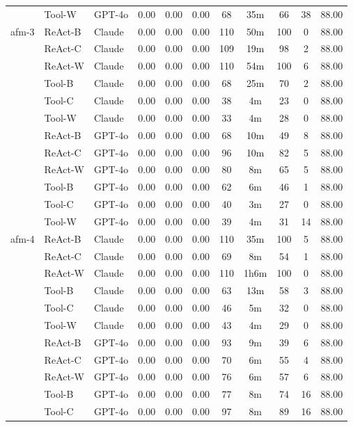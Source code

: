 \begin{longtable}{lllcccccccc}
 & Tool-W & GPT-4o & 0.00 & 0.00 & 0.00 & 68 & 35m & 66 & 38 & 88.00 \\
afm-3 & ReAct-B & Claude & 0.00 & 0.00 & 0.00 & 110 & 50m & 100 & 0 & 88.00 \\
 & ReAct-C & Claude & 0.00 & 0.00 & 0.00 & 109 & 19m & 98 & 2 & 88.00 \\
 & ReAct-W & Claude & 0.00 & 0.00 & 0.00 & 110 & 54m & 100 & 6 & 88.00 \\
 & Tool-B & Claude & 0.00 & 0.00 & 0.00 & 68 & 25m & 70 & 2 & 88.00 \\
 & Tool-C & Claude & 0.00 & 0.00 & 0.00 & 38 & 4m & 23 & 0 & 88.00 \\
 & Tool-W & Claude & 0.00 & 0.00 & 0.00 & 33 & 4m & 28 & 0 & 88.00 \\
 & ReAct-B & GPT-4o & 0.00 & 0.00 & 0.00 & 68 & 10m & 49 & 8 & 88.00 \\
 & ReAct-C & GPT-4o & 0.00 & 0.00 & 0.00 & 96 & 10m & 82 & 5 & 88.00 \\
 & ReAct-W & GPT-4o & 0.00 & 0.00 & 0.00 & 80 & 8m & 65 & 5 & 88.00 \\
 & Tool-B & GPT-4o & 0.00 & 0.00 & 0.00 & 62 & 6m & 46 & 1 & 88.00 \\
 & Tool-C & GPT-4o & 0.00 & 0.00 & 0.00 & 40 & 3m & 27 & 0 & 88.00 \\
 & Tool-W & GPT-4o & 0.00 & 0.00 & 0.00 & 39 & 4m & 31 & 14 & 88.00 \\
afm-4 & ReAct-B & Claude & 0.00 & 0.00 & 0.00 & 110 & 35m & 100 & 5 & 88.00 \\
 & ReAct-C & Claude & 0.00 & 0.00 & 0.00 & 69 & 8m & 54 & 1 & 88.00 \\
 & ReAct-W & Claude & 0.00 & 0.00 & 0.00 & 110 & 1h6m & 100 & 0 & 88.00 \\
 & Tool-B & Claude & 0.00 & 0.00 & 0.00 & 63 & 13m & 58 & 3 & 88.00 \\
 & Tool-C & Claude & 0.00 & 0.00 & 0.00 & 46 & 5m & 32 & 0 & 88.00 \\
 & Tool-W & Claude & 0.00 & 0.00 & 0.00 & 43 & 4m & 29 & 0 & 88.00 \\
 & ReAct-B & GPT-4o & 0.00 & 0.00 & 0.00 & 93 & 9m & 39 & 6 & 88.00 \\
 & ReAct-C & GPT-4o & 0.00 & 0.00 & 0.00 & 70 & 6m & 55 & 4 & 88.00 \\
 & ReAct-W & GPT-4o & 0.00 & 0.00 & 0.00 & 76 & 6m & 57 & 6 & 88.00 \\
 & Tool-B & GPT-4o & 0.00 & 0.00 & 0.00 & 77 & 8m & 74 & 16 & 88.00 \\
 & Tool-C & GPT-4o & 0.00 & 0.00 & 0.00 & 97 & 8m & 89 & 16 & 88.00 \\

\end{longtable}
